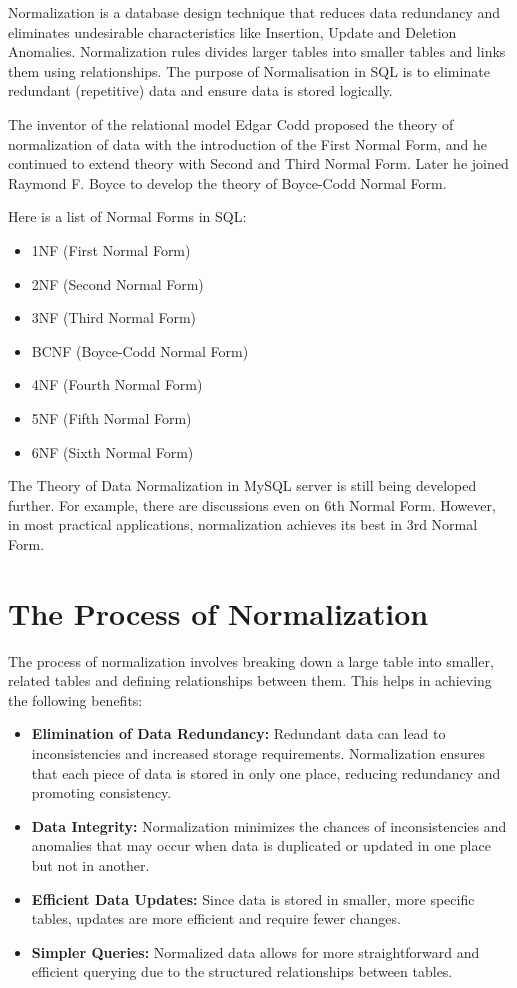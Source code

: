 \documentclass[
]{book}
\providecommand{\tightlist}{%
  \setlength{\itemsep}{0pt}\setlength{\parskip}{0pt}}
\begin{document}
Normalization is a database design technique that reduces data redundancy and eliminates undesirable characteristics like Insertion, Update and Deletion Anomalies. Normalization rules divides larger tables into smaller tables and links them using relationships. The purpose of Normalisation in SQL is to eliminate redundant (repetitive) data and ensure data is stored logically.

The inventor of the relational model Edgar Codd proposed the theory of normalization of data with the introduction of the First Normal Form, and he continued to extend theory with Second and Third Normal Form. Later he joined Raymond F. Boyce to develop the theory of Boyce-Codd Normal Form.

Here is a list of Normal Forms in SQL:

\begin{itemize}
\tightlist
\item
  1NF (First Normal Form)
\item
  2NF (Second Normal Form)
\item
  3NF (Third Normal Form)
\item
  BCNF (Boyce-Codd Normal Form)
\item
  4NF (Fourth Normal Form)
\item
  5NF (Fifth Normal Form)
\item
  6NF (Sixth Normal Form)
\end{itemize}

The Theory of Data Normalization in MySQL server is still being developed further. For example, there are discussions even on 6th Normal Form. However, in most practical applications, normalization achieves its best in 3rd Normal Form.

\hypertarget{the-process-of-normalization}{%
\section{The Process of Normalization}\label{the-process-of-normalization}}

The process of normalization involves breaking down a large table into smaller, related tables and defining relationships between them. This helps in achieving the following benefits:

\begin{itemize}
\tightlist
\item
  \textbf{Elimination of Data Redundancy:} Redundant data can lead to inconsistencies and increased storage requirements. Normalization ensures that each piece of data is stored in only one place, reducing redundancy and promoting consistency.
\item
  \textbf{Data Integrity:} Normalization minimizes the chances of inconsistencies and anomalies that may occur when data is duplicated or updated in one place but not in another.
\item
  \textbf{Efficient Data Updates:} Since data is stored in smaller, more specific tables, updates are more efficient and require fewer changes.
\item
  \textbf{Simpler Queries:} Normalized data allows for more straightforward and efficient querying due to the structured relationships between tables.
\end{itemize}
\end{document}
